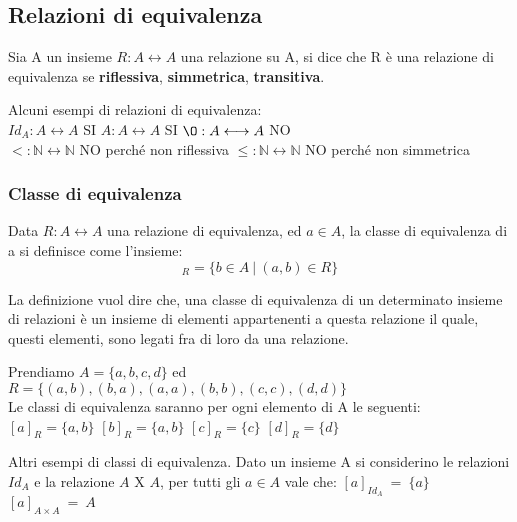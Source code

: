 \subsection{Relazioni di equivalenza}
\begin{definition}
    Sia A un insieme $R: A \longleftrightarrow A$ una relazione su A, si dice che R è una relazione di equivalenza se \textbf{riflessiva}, \textbf{simmetrica}, \textbf{transitiva}. 
\end{definition}
\begin{example}
Alcuni esempi di relazioni di equivalenza:\\
$Id_A: A \longleftrightarrow A$ SI \hspace{.7cm} $A: A \longleftrightarrow A$ SI \hspace{.7cm} $\O: A \longleftrightarrow A$ NO \\$<: \mathbb{N} \longleftrightarrow \mathbb{N}$ NO perché non riflessiva \hspace{.7cm} $\leq: \mathbb{N} \longleftrightarrow \mathbb{N}$ NO perché non simmetrica
\end{example}

\subsubsection{Classe di equivalenza}
\begin{definition}
    Data $R: A \longleftrightarrow A$ una relazione di equivalenza, ed $a \in A$, la classe di equivalenza di a si definisce come l'insieme: 
    \begin{equation}
        [a]_R = \{b \in A \:|\: (a,b) \in R\}
    \end{equation}
\end{definition}
La definizione vuol dire che, una classe di equivalenza di un determinato insieme di relazioni è un insieme di elementi appartenenti a questa relazione il quale, questi elementi, sono legati fra di loro da una relazione.
\begin{example}
    Prendiamo $A = \{a,b,c,d\}$ ed $R = \{(a,b), (b,a), (a,a), (b,b), (c,c), (d,d)\}$\\
    Le classi di equivalenza saranno per ogni elemento di A le seguenti:\\
    $[a]_R = \{a,b\}$ \hspace{.5cm} $[b]_R = \{a,b\}$ \hspace{.5cm} $[c]_R = \{c\}$ \hspace{.5cm} $[d]_R = \{d\}$
\end{example}
\begin{example}
    Altri esempi di classi di equivalenza. Dato un insieme A si considerino le relazioni $Id_A$ e la relazione $A$ X $A$, per tutti gli $a \in A$ vale che: \: \: \:
    $[a]_{Id_A} \: = \: \{a\}$ \hspace{.7cm} $[a]_{A \times A} \: = \: A$
\end{example}

